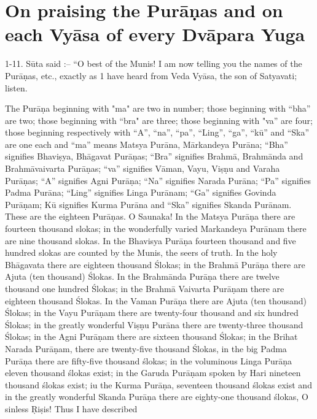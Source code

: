 \chapter{On praising the Pur\=a\d{n}as and on each Vy\=asa of every Dv\=apara Yuga}

1-11. S\=uta said :-- ``O best of the Munis! I am now telling you the names of the Pur\=a\d{n}as, etc., exactly as 1 have heard from Veda Vy\=asa, the son of Satyavati; listen.

The Pur\=a\d{n}a beginning with "ma" are two in number; those beginning with ``bha'' are two; those beginning with ``bra" are three; those beginning with "va'' are four; those beginning respectively with ``A'', ``na'', ``pa'', ``Ling'', ``ga'', ``k\=u'' and ``Ska'' are one each and ``ma'' means Matsya Pur\=ana, M\=arkandeya Pur\=ana; ``Bha'' signifies Bhavi\d{s}ya, Bh\=agavat Pur\=a\d{n}as; ``Bra'' signifies Brahm\=a, Brahm\=anda and Brahm\=avaivarta Pur\=a\d{n}as; ``va'' signifies V\=aman, Vayu, Vi\d{s}\d{n}u and Varaha Pur\=a\d{n}as; ``A'' signifies Agni Pur\=a\d{n}a; ``Na'' signifies Narada Pur\=ana; ``Pa'' signifies Padma Pur\=ana; ``Ling'' signifies Linga Pur\=anam; ``Ga'' signifies Govinda Pur\=a\d{n}am; K\=u signifies Kurma Pur\=ana and ``Ska'' signifies Skanda Pur\=anam. These are the eighteen Pur\=a\d{n}as. O Saunaka! In the Matsya Pur\=a\d{n}a there are fourteen thousand slokas; in the wonderfully varied Markandeya Pur\=anam there are nine thousand slokas. In the Bhavisya Pur\=a\d{n}a fourteen thousand and five hundred slokas are counted by the Munis, the seers of truth. In the holy Bh\=agavata there are eighteen thousand \'Slokas; in the Brahm\=a Pur\=a\d{n}a there are Ajuta (ten thousand) \'Slokas. In the Brahm\=anda Pur\=a\d{n}a there are twelve thousand one hundred \'Slokas; in the Brahm\=a Vaivarta Pur\=a\d{n}am there are eighteen thousand \'Slokas. In the Vaman Pur\=a\d{n}a there are Ajuta (ten thousand) \'Slokas; in the Vayu Pur\=a\d{n}am there are twenty-four thousand and six hundred \'Slokas; in the greatly wonderful Vi\d{s}\d{n}u Pur\=ana there are twenty-three thousand \'Slokas; in the Agni Pur\=a\d{n}am there are sixteen thousand \'Slokas; in the Brihat Narada Pur\=a\d{n}am, there are twenty-five thousand \'Slokas, in the big Padma Pur\=a\d{n}a there are fifty-five thousand \'slokas; in the voluminous Linga Pur\=a\d{n}a eleven thousand \'slokas exist; in the Garuda Pur\=a\d{n}am spoken by Hari nineteen thousand \'slokas exist; iu the Kurma Pur\=a\d{n}a, seventeen thousand \'slokas exist and in the greatly wonderful Skanda Pur\=a\d{n}a there are eighty-one thousand \'slokas, O sinless \d{R}i\d{s}is! Thus I have described

